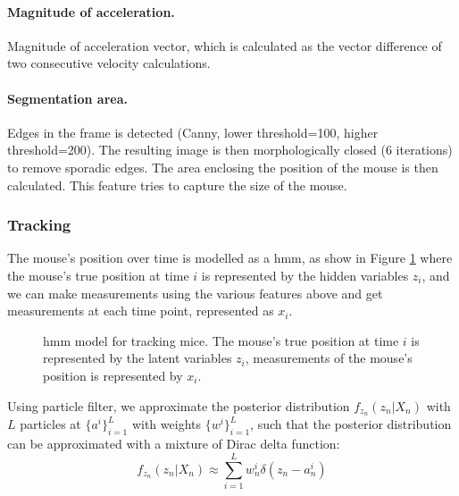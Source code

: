 \paragraph{Magnitude of acceleration.} Magnitude of acceleration vector, which is calculated as the vector difference of two consecutive velocity calculations. 

\paragraph{Segmentation area.} Edges in the frame is detected (Canny, lower threshold=100, higher threshold=200). The resulting image is then morphologically closed (6 iterations) to remove sporadic edges. The area enclosing the position of the mouse is then calculated. This feature tries to capture the size of the mouse.

\subsubsection{Tracking}

The mouse's position over time is modelled as a \gls{hmm}, as show in Figure \ref{f.ad.hmm} where the mouse's true position at time $i$ is represented by the hidden variables $z_i$, and we can make measurements using the various features above and get measurements at each time point, represented as $x_i$. 

\begin{figure}[h]
    
    \caption[\gls{hmm} model for tracking mice.]{\gls{hmm} model for tracking mice. The mouse's true position at time $i$ is represented by the latent variables $z_i$, measurements of the mouse's position is represented by $x_i$. \label{f.ad.hmm}}
\end{figure}

Using particle filter, we approximate the posterior distribution $f_{z_n}(z_n|X_n)$ with $L$ particles at $\{a^i\}_{i=1}^L$ with weights $\{w^i\}_{i=1}^L$, such that the posterior distribution can be approximated with a mixture of Dirac delta function: 
\begin{equation} \label{zn_approx}
    f_{z_n}(z_n|X_n) \approx \sum_{i=1}^Lw_n^i\delta(z_n - a_n^i)
\end{equation}

